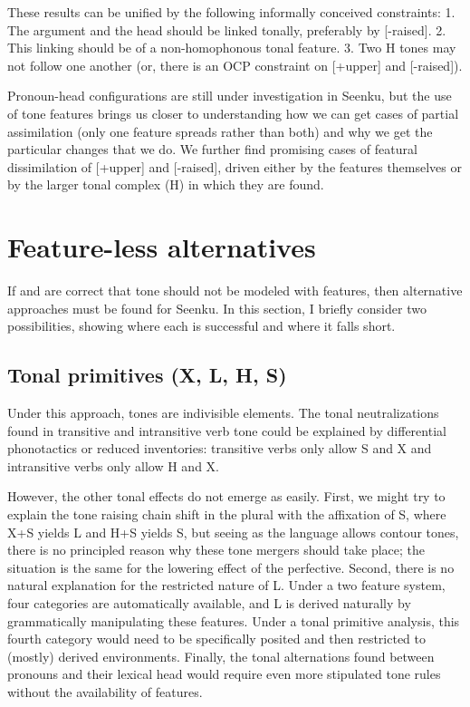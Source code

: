 \documentclass[output=paper]{langsci/langscibook}
\begin{document}
These results can be unified by the following informally conceived constraints: 1. The argument and the head should be linked tonally, preferably by [-raised]. 2. This linking should be of a non-homophonous tonal feature. 3. Two H tones may not follow one another (or, there is an OCP constraint on [+upper] and [-raised]). 

Pronoun-head configurations are still under investigation in Seenku, but the use of tone features brings us closer to understanding how we can get cases of partial assimilation (only one feature spreads rather than both) and why we get the particular changes that we do. We further find promising cases of featural dissimilation of [+upper] and [-raised], driven either by the features themselves or by the larger tonal complex (H) in which they are found.



\section{Feature-less alternatives}\label{sec:mcpherson:SecAlternatives}

If \citet{Hyman10b} and \citet{Clementsetal10} are correct that tone should not be modeled with features, then alternative approaches must be found for Seenku. In this section, I briefly consider two possibilities, showing where each is successful and where it falls short.

\subsection{Tonal primitives (X, L, H, S)}\label{sec:mcpherson:5.1}

Under this approach, tones are indivisible elements. The tonal neutralizations found in transitive and intransitive verb tone could be explained by differential phonotactics or reduced inventories: transitive verbs only allow S and X and intransitive verbs only allow H and X.

However, the other tonal effects do not emerge as easily. First, we might try to explain the tone raising chain shift in the plural with the affixation of S, where X+S yields L and H+S yields S, but seeing as the language allows contour tones, there is no principled reason why these tone mergers should take place; the situation is the same for the lowering effect of the perfective. Second, there is no natural explanation for the restricted nature of L. Under a two feature system, four categories are automatically available, and L is derived naturally by grammatically manipulating these features. Under a tonal primitive analysis, this fourth category would need to be specifically posited and then restricted to (mostly) derived environments. Finally, the tonal alternations found between pronouns and their lexical head would require even more stipulated tone rules without the availability of features.
\end{document}

